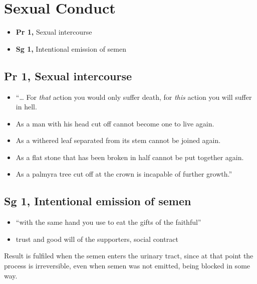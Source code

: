 \chapter{Sexual Conduct}

\begin{itemize}
\tightlist
\item
  \textbf{Pr 1,} Sexual intercourse
\item
  \textbf{Sg 1,} Intentional emission of semen
\end{itemize}

\section{Pr 1, Sexual intercourse}


\begin{itemize}
\tightlist
\item
  ``\ldots{} For \emph{that} action you would only suffer death, for
  \emph{this} action you will suffer in hell.
\item
  As a man with his head cut off cannot become one to live again.
\item
  As a withered leaf separated from its stem cannot be joined again.
\item
  As a flat stone that has been broken in half cannot be put together
  again.
\item
  As a palmyra tree cut off at the crown is incapable of further
  growth.''
\end{itemize}

\clearpage

\section{Sg 1, Intentional emission of semen}


\begin{itemize}
\tightlist
\item
  ``with the same hand you use to eat the gifts of the faithful''
\item
  trust and good will of the supporters, social contract
\end{itemize}

Result is fulfiled when the semen enters the urinary tract, since at
that point the process is irreversible, even when semen was not emitted,
being blocked in some way.

